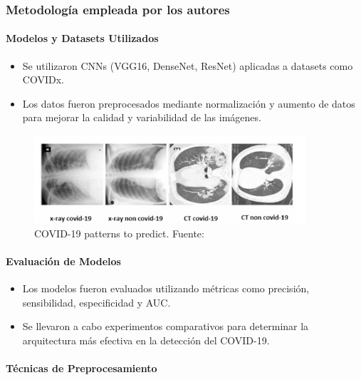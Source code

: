 \subsubsection{Metodología empleada por los autores}

\paragraph{Modelos y Datasets Utilizados}

\begin{itemize}
\item Se utilizaron CNNs (VGG16, DenseNet, ResNet) aplicadas a datasets como COVIDx.
\item Los datos fueron preprocesados mediante normalización y aumento de datos para mejorar la calidad y variabilidad de las imágenes.
\end{itemize}

\begin{figure}[H]
    \centering
    \includegraphics[width=0.9\textwidth]{images_repo/patronescovid.jpg}
    \caption{COVID-19 patterns to predict. Fuente: \cite{sharma2020deep}}
    \label{fig:COVID19_patterns}
\end{figure}

\paragraph{Evaluación de Modelos}

\begin{itemize}
\item Los modelos fueron evaluados utilizando métricas como precisión, sensibilidad, especificidad y AUC.
\item Se llevaron a cabo experimentos comparativos para determinar la arquitectura más efectiva en la detección del COVID-19.
\end{itemize}

\paragraph{Técnicas de Preprocesamiento}

